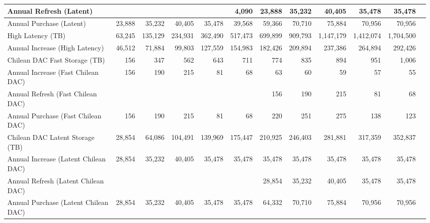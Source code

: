\begin{longtable} { |p{}  |r  |r  |r  |r  |r  |r  |r  |r  |r  |r  |r |}
{Annual Refresh (Latent)}&{}&{}&{}&{}&{4,090}&{23,888}&{35,232}&{40,405}&{35,478}&{35,478} \\ \hline
{Annual Purchase (Latent)}&{23,888}&{35,232}&{40,405}&{35,478}&{39,568}&{59,366}&{70,710}&{75,884}&{70,956}&{70,956} \\ \hline
{High Latency (TB)}&{63,245}&{135,129}&{234,931}&{362,490}&{517,473}&{699,899}&{909,793}&{1,147,179}&{1,412,074}&{1,704,500} \\ \hline
{Annual Increase (High Latency)}&{46,512}&{71,884}&{99,803}&{127,559}&{154,983}&{182,426}&{209,894}&{237,386}&{264,894}&{292,426} \\ \hline
{Chilean DAC Fast Storage (TB)}&{156}&{347}&{562}&{643}&{711}&{774}&{835}&{894}&{951}&{1,006} \\ \hline
{Annual Increase (Fast Chilean DAC)}&{156}&{190}&{215}&{81}&{68}&{63}&{60}&{59}&{57}&{55} \\ \hline
{Annual Refresh (Fast Chilean DAC)}&{}&{}&{}&{}&{}&{156}&{190}&{215}&{81}&{68} \\ \hline
{Annual Purchase (Fast Chilean DAC)}&{156}&{190}&{215}&{81}&{68}&{220}&{251}&{275}&{138}&{123} \\ \hline
{Chilean DAC Latent Storage (TB)}&{28,854}&{64,086}&{104,491}&{139,969}&{175,447}&{210,925}&{246,403}&{281,881}&{317,359}&{352,837} \\ \hline
{Annual Increase (Latent Chilean DAC)}&{28,854}&{35,232}&{40,405}&{35,478}&{35,478}&{35,478}&{35,478}&{35,478}&{35,478}&{35,478} \\ \hline
{Annual Refresh (Latent Chilean DAC)}&{}&{}&{}&{}&{}&{28,854}&{35,232}&{40,405}&{35,478}&{35,478} \\ \hline
{Annual Purchase (Latent Chilean DAC)}&{28,854}&{35,232}&{40,405}&{35,478}&{35,478}&{64,332}&{70,710}&{75,884}&{70,956}&{70,956} \\ \hline
\end{longtable} \normalsize
